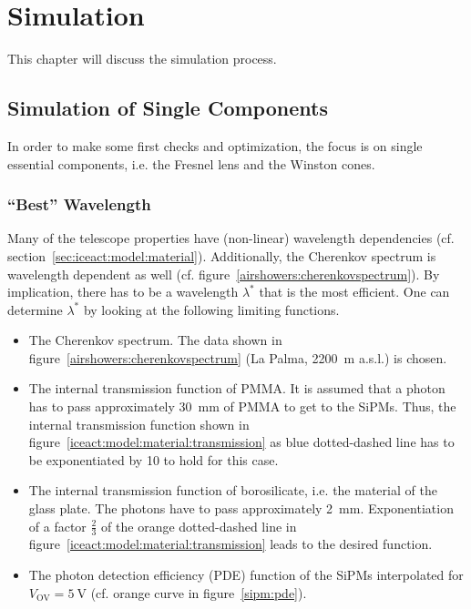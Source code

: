 \chapter{\iceact Simulation}\label{chap:iceact_sim}

This chapter will discuss the \geant simulation process. 

\section{Simulation of Single Components}

In order to make some first checks and optimization, the focus is on single essential components, i.e. the Fresnel lens and the Winston cones.

\subsection{\enquote{Best} Wavelength}

Many of the \iceact telescope properties have (non-linear) wavelength dependencies (cf. section~\ref{sec:iceact:model:material}). Additionally, the Cherenkov spectrum is wavelength dependent as well (cf. figure~\ref{airshowers:cherenkovspectrum}). By implication, there has to be a wavelength $\lambda^\ast$ that \iceact is the most efficient. One can determine $\lambda^\ast$ by looking at the following limiting functions.

\begin{itemize}
	\item The Cherenkov spectrum. The data shown in figure~\ref{airshowers:cherenkovspectrum} (La Palma, \SI{2200}{\meter} a.s.l.) is chosen.
	\item The internal transmission function of PMMA. It is assumed that a photon has to pass approximately \SI{30}{\milli\meter} of PMMA to get to the SiPMs. Thus, the internal transmission function shown in figure~\ref{iceact:model:material:transmission} as blue dotted-dashed line has to be exponentiated by \num{10} to hold for this case.
	\item The internal transmission function of borosilicate, i.e. the material of the glass plate. The photons have to pass approximately \SI{2}{\milli\meter}. Exponentiation of a factor $\frac{2}{3}$ of the orange dotted-dashed line in figure~\ref{iceact:model:material:transmission} leads to the desired function.
	\item The photon detection efficiency (PDE) function of the SiPMs interpolated for $V_\text{OV} = \SI{5}{\volt}$ (cf. orange curve in figure~\ref{sipm:pde}).
\end{itemize}

